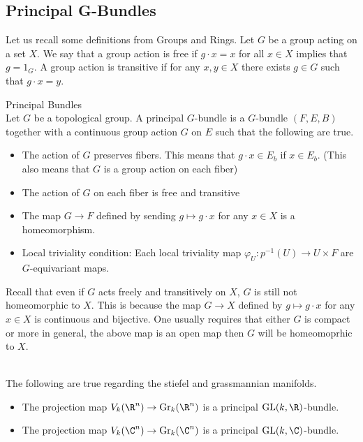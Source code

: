 \documentclass[a4paper]{article}
\begin{document}
\subsection{Principal G-Bundles}
Let us recall some definitions from Groups and Rings. Let $G$ be a group acting on a set $X$. We say that a group action is free if $g\cdot x=x$ for all $x\in X$ implies that $g=1_G$. A group action is transitive if for any $x,y\in X$ there exists $g\in G$ such that $g\cdot x=y$. 

\begin{defn}{Principal Bundles}{}\\
Let $G$ be a topological group. A principal $G$-bundle is a $G$-bundle $(F,E,B)$ together with a continuous group action $G$ on $E$ such that the following are true. 
\begin{itemize}
\item The action of $G$ preserves fibers. This means that $g\cdot x\in E_b$ if $x\in E_b$. (This also means that $G$ is a group action on each fiber)
\item The action of $G$ on each fiber is free and transitive
\item The map $G\to F$ defined by sending $g\mapsto g\cdot x$ for any $x\in X$ is a homeomorphism. 
\item Local triviality condition: Each local triviality map $\varphi_U:p^{-1}(U)\to U\times F$ are $G$-equivariant maps. 
\end{itemize}
\end{defn}

Recall that even if $G$ acts freely and transitively on $X$, $G$ is still not homeomorphic to $X$. This is because the map $G\to X$ defined by $g\mapsto g\cdot x$ for any $x\in X$ is continuous and bijective. One usually requires that either $G$ is compact or more in general, the above map is an open map then $G$ will be homeomoprhic to $X$. 

\begin{eg}{}{}\\
The following are true regarding the stiefel and grassmannian manifolds. 
\begin{itemize}
\item The projection map $V_k(\R^n)\to\text{Gr}_k(\R^n)$ is a principal $\text{GL}(k,\R)$-bundle. 
\item The projection map $V_k(\C^n)\to\text{Gr}_k(\C^n)$ is a principal $\text{GL}(k,\C)$-bundle. 
\end{itemize}
\end{eg}
\end{document}
